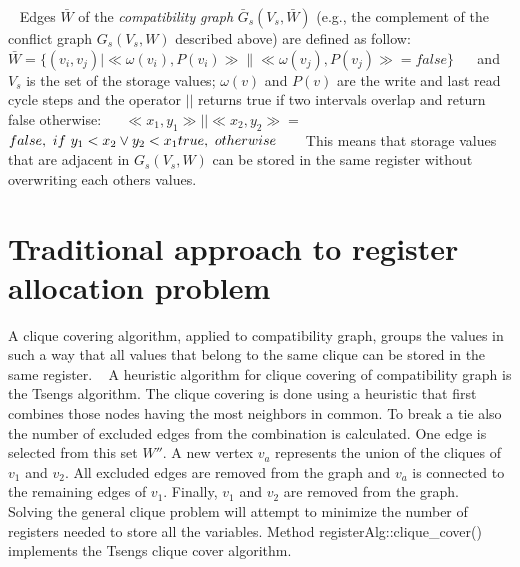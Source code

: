 ~\newline
 Edges $\bar{W}$ of the {\itshape compatibility} {\itshape graph} $ \bar{G}_s(V_s,\bar{W}) $ (e.\+g., the complement of the conflict graph $ G_s(V_s,W) $ described above) are defined as follow\+:~\newline
~\newline
 $ \bar{W}=\lbrace (v_{i},v_{j}) \mid \ll \omega(v_{i}),P(v_{i}) \gg \parallel \ll \omega(v_{j}),P(v_{j}) \gg = false\rbrace $~\newline
~\newline
 and $V_s$ is the set of the storage values; $\omega(v)$ and $P(v)$ are the write and last read cycle steps and the operator $||$ returns true if two intervals overlap and return false otherwise\+:~\newline
~\newline
 $\ll x_1, y_1 \gg || \ll x_2, y_2 \gg =$ $ \\false,\ if\ y_1<x_2\vee y_2<x_1\\true,\ otherwise$ ~\newline
~\newline
 This means that storage values that are adjacent in $G_s(V_s,W)$ can be stored in the same register without overwriting each others values.\hypertarget{src_HLS_registerAllocation_page_traditional}{}\section{Traditional approach to register allocation problem}\label{src_HLS_registerAllocation_page_traditional}
A clique covering algorithm, applied to compatibility graph, groups the values in such a way that all values that belong to the same clique can be stored in the same register. ~\newline
 A heuristic algorithm for clique covering of compatibility graph is the Tseng\textquotesingle{}s algorithm. The clique covering is done using a heuristic that first combines those nodes having the most neighbors in common. To break a tie also the number of excluded edges from the combination is calculated. One edge is selected from this set $W''$. A new vertex $v_a$ represents the union of the cliques of $v_1$ and $v_2$. All excluded edges are removed from the graph and $v_a$ is connected to the remaining edges of $v_1$. Finally, $v_1$ and $v_2$ are removed from the graph.~\newline
 Solving the general clique problem will attempt to minimize the number of registers needed to store all the variables. Method register\+Alg\+::clique\+\_\+cover() implements the Tseng\textquotesingle{}s clique cover algorithm.~\newline
